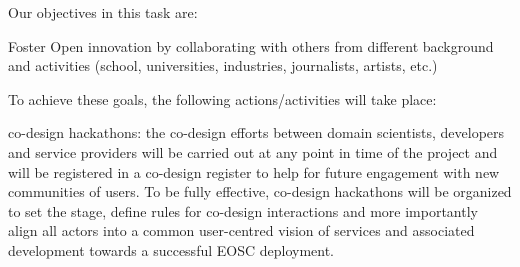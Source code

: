 \begin{task}[
  title=Training Workshops for more reproducible science,
  id=workshops,
  lead=UIO,
  PM=10,
  wphases={12-36!.416},
  partners={SRL,MP,IFR}
]
Our objectives in this task are: %
  \begin{compactitem}

% 
% 

% 

\item Foster Open innovation by collaborating with others from different background and activities (school, universities, industries, journalists, artists, etc.)
  \end{compactitem}

To achieve these goals, the following actions/activities will take place:

  \begin{compactitem}
   \item co-design hackathons: the co-design efforts between domain scientists, \TheProject developers and service providers will be carried out at any point in time of the project and will be registered in a co-design register to help for future engagement with new communities of users. To be fully effective,  co-design hackathons will be organized to set the stage, define rules for co-design interactions and more importantly align all actors into a common user-centred vision of \TheProject services and associated development towards a successful EOSC deployment.



\end{compactitem}
\end{task}
